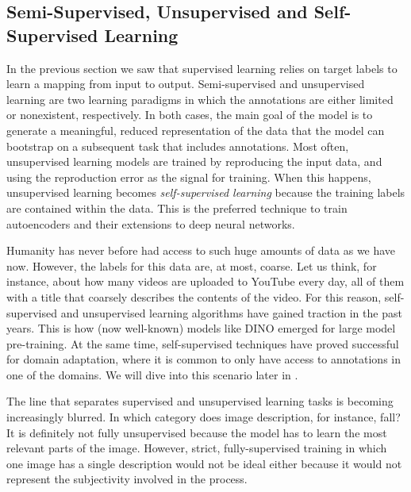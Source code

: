 \subsection{Semi-Supervised, Unsupervised and Self-Supervised Learning}\label{subsec:semi_self}
In the previous section we saw that supervised learning relies on target labels to learn a mapping from input to output. Semi-supervised and unsupervised learning are two learning paradigms in which the annotations are either limited or nonexistent, respectively. In both cases, the main goal of the model is to generate a meaningful, reduced representation of the data that the model can bootstrap on a subsequent task that includes annotations. Most often, unsupervised learning models are trained by reproducing the input data, and using the reproduction error as the signal for training. When this happens, unsupervised learning becomes \textit{self-supervised learning} because the training labels are contained within the data. This is the preferred technique to train autoencoders and their extensions to deep neural networks. 

Humanity has never before had access to such huge amounts of data as we have now. However, the labels for this data are, at most, coarse. Let us think, for instance, about how many videos are uploaded to YouTube every day, all of them with a title that coarsely describes the contents of the video. For this reason, self-supervised and unsupervised learning algorithms have gained traction in the past years. This is how (now well-known) models like DINO emerged for large model pre-training. At the same time, self-supervised techniques have proved successful for domain adaptation, where it is common to only have access to annotations in one of the domains. We will dive into this scenario later in .

The line that separates supervised and unsupervised learning tasks is becoming increasingly blurred. In which category does image description, for instance, fall? It is definitely not fully unsupervised because the model has to learn the most relevant parts of the image. However, strict, fully-supervised training in which one image has a single description would not be ideal either because it would not represent the subjectivity involved in the process.

